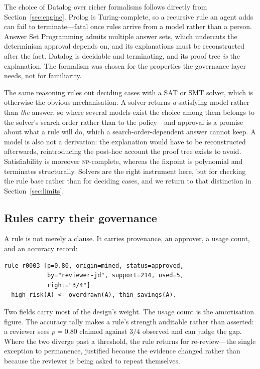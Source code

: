 \documentclass[sigconf,nonacm]{acmart}
\begin{document}
The choice of Datalog over richer formalisms follows directly from
Section~\ref{sec:engine}. Prolog is Turing-complete, so a recursive rule an
agent adds can fail to terminate---fatal once rules arrive from a model rather
than a person. Answer Set Programming admits multiple answer sets, which
undercuts the determinism approval depends on, and its explanations must be
reconstructed after the fact. Datalog is decidable and terminating, and its
proof tree \emph{is} the explanation. The formalism was chosen for the
properties the governance layer needs, not for familiarity.

The same reasoning rules out deciding cases with a SAT or SMT solver, which is
otherwise the obvious mechanisation. A solver returns \emph{a} satisfying model
rather than \emph{the} answer, so where several models exist the choice among
them belongs to the solver's search order rather than to the policy---and
approval is a promise about what a rule will do, which a search-order-dependent
answer cannot keep. A model is also not a derivation: the explanation would have
to be reconstructed afterwards, reintroducing the post-hoc account the proof
tree exists to avoid. Satisfiability is moreover \textsc{np}-complete, whereas
the fixpoint is polynomial and terminates structurally. Solvers are the right
instrument here, but for checking the rule base rather than for deciding cases,
and we return to that distinction in Section~\ref{sec:limits}.

\subsection{Rules carry their governance}

A rule is not merely a clause. It carries provenance, an approver, a usage
count, and an accuracy record:

\begin{lstlisting}
rule r0003 [p=0.80, origin=mined, status=approved,
            by="reviewer-jd", support=214, used=5,
            right="3/4"]
  high_risk(A) <- overdrawn(A), thin_savings(A).
\end{lstlisting}

Two fields carry most of the design's weight. The usage count is the
amortisation figure. The accuracy tally makes a rule's strength auditable rather
than asserted: a reviewer sees $p{=}0.80$ claimed against $3/4$ observed and can
judge the gap. Where the two diverge past a threshold, the rule returns for
re-review---the single exception to permanence, justified because the evidence
changed rather than because the reviewer is being asked to repeat themselves.
\end{document}
